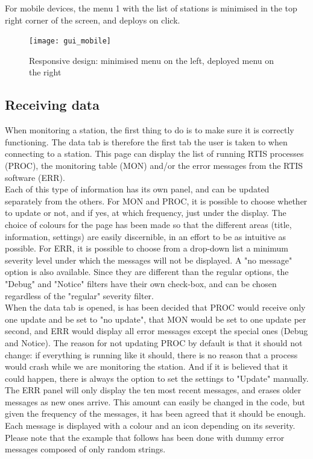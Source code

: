 \documentclass{themeensg}
\begin{document}
For mobile devices, the menu 1 with the list of stations is minimised in the top right corner of the screen, and deploys on click.\\

\begin{figure}[ht]
	\centering
	\texttt{[image: gui\_mobile]}
	\caption{Responsive design: minimised menu on the left, deployed menu on the right}
\end{figure}


\subsection{Receiving data}

When monitoring a station, the first thing to do is to make sure it is correctly functioning. The data tab is therefore the first tab the user is taken to when connecting to a station. This page can display the list of running RTIS processes (PROC), the monitoring table (MON) and/or the error messages from the RTIS software (ERR).\\
Each of this type of information has its own panel, and can be updated separately from the others. For MON and PROC, it is possible to choose whether to update or not, and if yes, at which frequency, just under the display. The choice of colours for the page has been made so that the different areas (title, information, settings) are easily discernible, in an effort to be as intuitive as possible. For ERR, it is possible to choose from a drop-down list a minimum severity level under which the messages will not be displayed. A "no message" option is also available. Since they are different than the regular options, the "Debug" and "Notice" filters have their own check-box, and can be chosen regardless of the "regular" severity filter. \\

When the data tab is opened, is has been decided that PROC would receive only one update and be set to "no update", that MON would be set to one update per second, and ERR would display all error messages except the special ones (Debug and Notice). The reason for not updating PROC by default is that it should not change: if everything is running like it should, there is no reason that a process would crash while we are monitoring the station. And if it is believed that it could happen, there is always the option to set the settings to "Update" manually.\\

The ERR panel will only display the ten most recent messages, and erases older messages as new ones arrive. This amount can easily be changed in the code, but given the frequency of the messages, it has been agreed that it should be enough. Each message is displayed with a colour and an icon depending on its severity. Please note that the example that follows has been done with dummy error messages composed of only random strings.\\
\end{document}
